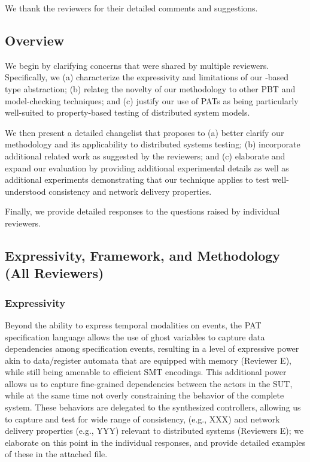 We thank the reviewers for their detailed comments and suggestions.

\subsection{Overview}

We begin by clarifying concerns that were shared by multiple
reviewers. Specifically, we (a) characterize the expressivity and limitations of our
\PAT-based type abstraction; (b) relateg the novelty of our
methodology to other PBT and model-checking techniques; and (c)
justify our use of PATs as being particularly well-suited to
property-based testing of distributed system models. 

We then present a detailed changelist that proposes to (a) better
clarify our methodology and its applicability to distributed systems
testing; (b) incorporate additional related work as suggested by the
reviewers; and (c) elaborate and expand our evaluation by providing
additional experimental details as well as additional experiments
demonstrating that our technique applies to test well-understood
consistency and network delivery properties.

Finally, we provide detailed responses to the questions raised by
individual reviewers.

\subsection{Expressivity, Framework, and Methodology (All Reviewers)}

\subsubsection{Expressivity}


Beyond the ability to express temporal modalities on events, the PAT
specification language allows the use of ghost variables to capture
data dependencies among specification events, resulting in a level of
expressive power akin to data/register automata that are equipped with
memory (Reviewer E), while still being amenable to efficient SMT
encodings. This additional power allows us to capture fine-grained
dependencies between the actors in the SUT, while at the same time not
overly constraining the behavior of the complete system. These
behaviors are delegated to the synthesized controllers, allowing us to
capture and test for wide range of consistency, (e.g., XXX) and
network delivery properties (e.g., YYY) relevant to distributed
systems (Reviewers E); we elaborate on this point in the individual
responses, and provide detailed examples of these in the attached
file.

